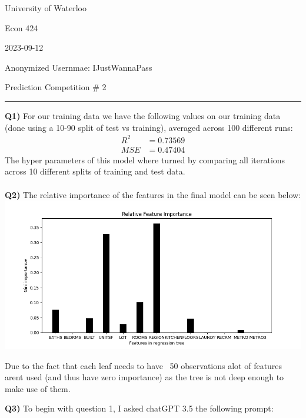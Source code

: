 \documentclass{article}
\begin{document}
\begin{titlepage}
	\setlength{\parindent}{0pt}
	\large

\vspace*{-2cm}

University of Waterloo \par
Econ 424 \par
2023-09-12 \par
\vspace{0.05cm}
Anonymized Usernmae: IJustWannaPass
\vspace{0.2cm}

{\huge Prediction Competition \# 2 \par}
\hrule

\vspace{1cm}
\textbf{Q1)} For our training data we have the following values on our training data (done using a 10-90 split of test vs training), averaged across 100 different runs:
\begin{align*}
R^2 &=  0.73569\\
MSE &= 0.47404
\end{align*}
The hyper parameters of this model where turned by comparing all iterations across 10 different splits of training and test data.\\\\
\textbf{Q2)} The relative importance of the features in the final model can be seen below: \\

\includegraphics[width=\textwidth]{relativeImportance.png}

Due to the fact that each leaf needs to have ~50 observations alot of features arent used (and thus have zero importance) as the tree is not deep enough to make use of them. \\

\newpage

\textbf{Q3)} To begin with question 1, I asked chatGPT 3.5 the following prompt:


\end{titlepage}
\end{document}
